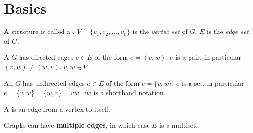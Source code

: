 \section{Basics}

\begin{definition}
A structure  is called a .
$V=\{v_1, v_2, \ldots, v_n\}$ is the \emph{vertex set} of $G$. $E$ is the
\emph{edge set} of $G$.
\end{definition}

\begin{definition}
A  $G$ has directed edges $e\in E$ of the form
$e=(v,w)$. $e$ is a pair, in particular $(v,w)\ne (w,v)$. $v,w\in V$.
\end{definition}

\begin{definition}
An  $G$ has undirected edges $e\in E$ of the form
$e=\{v,w\}$. $e$ is a set, in particular $e=\{v,w\}=\{w,v\}=vw$. $vw$ is a
shorthand notation.
\end{definition}

A  is an edge from a vertex to itself.

Graphs can have \textbf{multiple edges}, in which case $E$ is a multiset.

